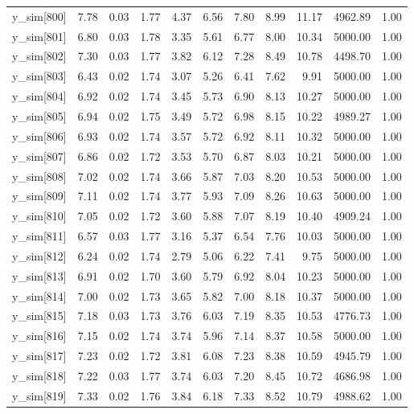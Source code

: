 \begin{table}[ht]
\begin{tabular}{rrrrrrrrrrr}
  y\_sim[800] & 7.78 & 0.03 & 1.77 & 4.37 & 6.56 & 7.80 & 8.99 & 11.17 & 4962.89 & 1.00 \\ 
  y\_sim[801] & 6.80 & 0.03 & 1.78 & 3.35 & 5.61 & 6.77 & 8.00 & 10.34 & 5000.00 & 1.00 \\ 
  y\_sim[802] & 7.30 & 0.03 & 1.77 & 3.82 & 6.12 & 7.28 & 8.49 & 10.78 & 4498.70 & 1.00 \\ 
  y\_sim[803] & 6.43 & 0.02 & 1.74 & 3.07 & 5.26 & 6.41 & 7.62 & 9.91 & 5000.00 & 1.00 \\ 
  y\_sim[804] & 6.92 & 0.02 & 1.74 & 3.45 & 5.73 & 6.90 & 8.13 & 10.27 & 5000.00 & 1.00 \\ 
  y\_sim[805] & 6.94 & 0.02 & 1.75 & 3.49 & 5.72 & 6.98 & 8.15 & 10.22 & 4989.27 & 1.00 \\ 
  y\_sim[806] & 6.93 & 0.02 & 1.74 & 3.57 & 5.72 & 6.92 & 8.11 & 10.32 & 5000.00 & 1.00 \\ 
  y\_sim[807] & 6.86 & 0.02 & 1.72 & 3.53 & 5.70 & 6.87 & 8.03 & 10.21 & 5000.00 & 1.00 \\ 
  y\_sim[808] & 7.02 & 0.02 & 1.74 & 3.66 & 5.87 & 7.03 & 8.20 & 10.53 & 5000.00 & 1.00 \\ 
  y\_sim[809] & 7.11 & 0.02 & 1.74 & 3.77 & 5.93 & 7.09 & 8.26 & 10.63 & 5000.00 & 1.00 \\ 
  y\_sim[810] & 7.05 & 0.02 & 1.72 & 3.60 & 5.88 & 7.07 & 8.19 & 10.40 & 4909.24 & 1.00 \\ 
  y\_sim[811] & 6.57 & 0.03 & 1.77 & 3.16 & 5.37 & 6.54 & 7.76 & 10.03 & 5000.00 & 1.00 \\ 
  y\_sim[812] & 6.24 & 0.02 & 1.74 & 2.79 & 5.06 & 6.22 & 7.41 & 9.75 & 5000.00 & 1.00 \\ 
  y\_sim[813] & 6.91 & 0.02 & 1.70 & 3.60 & 5.79 & 6.92 & 8.04 & 10.23 & 5000.00 & 1.00 \\ 
  y\_sim[814] & 7.00 & 0.02 & 1.73 & 3.65 & 5.82 & 7.00 & 8.18 & 10.37 & 5000.00 & 1.00 \\ 
  y\_sim[815] & 7.18 & 0.03 & 1.73 & 3.76 & 6.03 & 7.19 & 8.35 & 10.53 & 4776.73 & 1.00 \\ 
  y\_sim[816] & 7.15 & 0.02 & 1.74 & 3.74 & 5.96 & 7.14 & 8.37 & 10.58 & 5000.00 & 1.00 \\ 
  y\_sim[817] & 7.23 & 0.02 & 1.72 & 3.81 & 6.08 & 7.23 & 8.38 & 10.59 & 4945.79 & 1.00 \\ 
  y\_sim[818] & 7.22 & 0.03 & 1.77 & 3.74 & 6.03 & 7.20 & 8.45 & 10.72 & 4686.98 & 1.00 \\ 
  y\_sim[819] & 7.33 & 0.02 & 1.76 & 3.84 & 6.18 & 7.33 & 8.52 & 10.79 & 4988.62 & 1.00 \\ 

\end{tabular}
\end{table}

